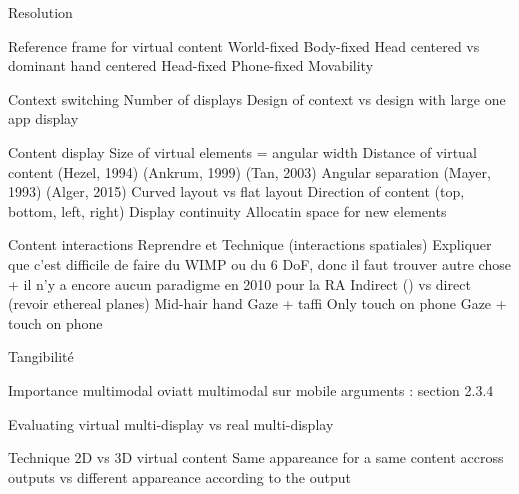         Resolution

        Reference frame for virtual content 
            World-fixed \cite{EnsFinneganIrani2014} 
            Body-fixed \cite{EnsFinneganIrani2014} 
                Head centered vs dominant hand centered 
            Head-fixed \cite{EnsFinneganIrani2014} 
            Phone-fixed
            Movability \cite{EnsHincapie-RamosIrani2014}

        Context switching 
            Number of displays \cite{RashidNacentaQuigley2012} \cite{CauchardLoechtefeldFraserEtAl2012}
            Design of context vs design with large one app display \cite{BallNorth2008}

        Content display
            Size of virtual elements = angular width \cite{ShuppBallYostEtAl2006} \cite{BallNorth2008}
            Distance of virtual content (Hezel, 1994) (Ankrum, 1999) (Tan, 2003) \cite{ChanKaoChenEtAl2010} \cite{EnsFinneganIrani2014} 
            Angular separation (Mayer, 1993) \cite{EnsFinneganIrani2014} \cite{KishishitaKiyokawaOrloskyEtAl2014} (Alger, 2015) 
            Curved layout vs flat layout \cite{ShuppBallYostEtAl2006} 
            Direction of content (top, bottom, left, right) \cite{EnsFinneganIrani2014} 
            Display continuity \cite{TanCzerwinski2003} \cite{RashidNacentaQuigley2012}
            Allocatin space for new elements \cite{BellFeiner2000}

        Content interactions
        	Reprendre \cite{Bernatchez2008} et \cite{JankowskiHachet2013}
        	Technique (interactions spatiales)
	        	Expliquer que c'est difficile de faire du WIMP ou du 6 DoF, donc il faut trouver autre chose \citet{AzumaBaillotBehringerEtAl2001} + il n'y a encore aucun paradigme en 2010 pour la RA \cite{VanKrevelenPoelman2010}
	        	Indirect (\cite{TeatherStuerzlinger2011}) vs direct (revoir ethereal planes)
	            Mid-hair hand \cite{EnsFinneganIrani2014} \cite{ChanKaoChenEtAl2010} \cite{JonesSodhiForsythEtAl2012}
	            Gaze + taffi 
	            Only touch on phone 
	            Gaze + touch on phone

	        Tangibilité

            Importance multimodal oviatt \cite{Oviatt2003}
            multimodal sur mobile \cite{HuerstVanWezel2011}
            arguments : \cite{CarmignianiFurhtAnisettiEtAl2011} section 2.3.4

        Evaluating virtual multi-display vs real multi-display 

        Technique 
            2D vs 3D virtual content \cite{JansenDragicevicFekete2013} \cite{SerranoHildebrandtSubramanianEtAl2014}
            Same appareance for a same content accross outputs vs different appareance according to the output \cite{GrubertHeinischQuigleyEtAl2015} 



